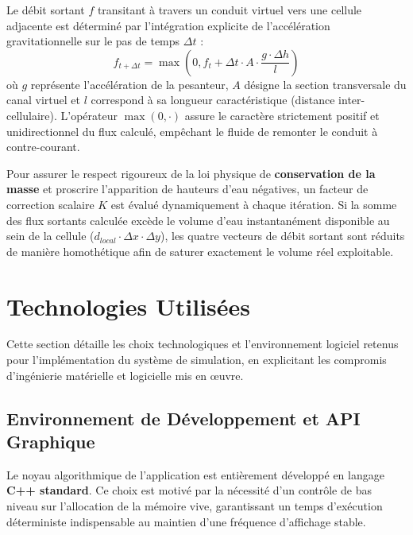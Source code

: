 \documentclass[10pt,twocolumn,a4paper]{article}
\begin{document}
Le débit sortant $f$ transitant à travers un conduit virtuel vers une cellule adjacente est déterminé par l'intégration explicite de l'accélération gravitationnelle sur le pas de temps $\Delta t$ :
\begin{equation}\label{eq:calcul_flux}
    f_{t+\Delta t} = \max \left(0, f_t + \Delta t \cdot A \cdot \frac{g \cdot \Delta h}{l} \right)
\end{equation}
où $g$ représente l'accélération de la pesanteur, $A$ désigne la section transversale du canal virtuel et $l$ correspond à sa longueur caractéristique (distance inter-cellulaire). L'opérateur $\max(0, \cdot)$ assure le caractère strictement positif et unidirectionnel du flux calculé, empêchant le fluide de remonter le conduit à contre-courant.

Pour assurer le respect rigoureux de la loi physique de \textbf{conservation de la masse} et proscrire l'apparition de hauteurs d'eau négatives, un facteur de correction scalaire $K$ est évalué dynamiquement à chaque itération. Si la somme des flux sortants calculée excède le volume d'eau instantanément disponible au sein de la cellule ($d_{local} \cdot \Delta x \cdot \Delta y$), les quatre vecteurs de débit sortant sont réduits de manière homothétique afin de saturer exactement le volume réel exploitable.

\section{Technologies Utilisées}\label{sec:technologies}

Cette section détaille les choix technologiques et l'environnement logiciel retenus pour l'implémentation du système de simulation, en explicitant les compromis d'ingénierie matérielle et logicielle mis en œuvre.

\subsection{Environnement de Développement et API Graphique}\label{subsec:env_dev}
Le noyau algorithmique de l'application est entièrement développé en langage \textbf{C++ standard}. Ce choix est motivé par la nécessité d'un contrôle de bas niveau sur l'allocation de la mémoire vive, garantissant un temps d'exécution déterministe indispensable au maintien d'une fréquence d'affichage stable.
\end{document}
